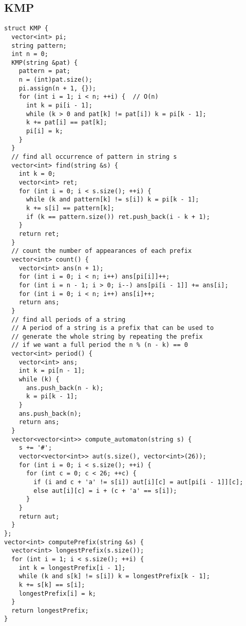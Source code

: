 \documentclass[twoside]{article}
\begin{document}
\begin{multicols*}{2}
{\subsection*{KMP}
}
\begin{verbatim}
struct KMP {
  vector<int> pi;
  string pattern;
  int n = 0;
  KMP(string &pat) {
    pattern = pat;
    n = (int)pat.size();
    pi.assign(n + 1, {});
    for (int i = 1; i < n; ++i) {  // O(n)
      int k = pi[i - 1];
      while (k > 0 and pat[k] != pat[i]) k = pi[k - 1];
      k += pat[i] == pat[k];
      pi[i] = k;
    }
  }
  // find all occurrence of pattern in string s
  vector<int> find(string &s) {
    int k = 0;
    vector<int> ret;
    for (int i = 0; i < s.size(); ++i) {
      while (k and pattern[k] != s[i]) k = pi[k - 1];
      k += s[i] == pattern[k];
      if (k == pattern.size()) ret.push_back(i - k + 1);
    }
    return ret;
  }
  // count the number of appearances of each prefix
  vector<int> count() {
    vector<int> ans(n + 1);
    for (int i = 0; i < n; i++) ans[pi[i]]++;
    for (int i = n - 1; i > 0; i--) ans[pi[i - 1]] += ans[i];
    for (int i = 0; i < n; i++) ans[i]++;
    return ans;
  }
  // find all periods of a string
  // A period of a string is a prefix that can be used to
  // generate the whole string by repeating the prefix
  // if we want a full period the n % (n - k) == 0
  vector<int> period() {
    vector<int> ans;
    int k = pi[n - 1];
    while (k) {
      ans.push_back(n - k);
      k = pi[k - 1];
    }
    ans.push_back(n);
    return ans;
  }
  vector<vector<int>> compute_automaton(string s) {
    s += '#';
    vector<vector<int>> aut(s.size(), vector<int>(26));
    for (int i = 0; i < s.size(); ++i) {
      for (int c = 0; c < 26; ++c) {
        if (i and c + 'a' != s[i]) aut[i][c] = aut[pi[i - 1]][c];
        else aut[i][c] = i + (c + 'a' == s[i]);
      }
    }
    return aut;
  }
};
vector<int> computePrefix(string &s) {
  vector<int> longestPrefix(s.size());
  for (int i = 1; i < s.size(); ++i) {
    int k = longestPrefix[i - 1];
    while (k and s[k] != s[i]) k = longestPrefix[k - 1];
    k += s[k] == s[i];
    longestPrefix[i] = k;
  }
  return longestPrefix;
}
\end{verbatim}

{
}
\end{multicols*}
\end{document}
